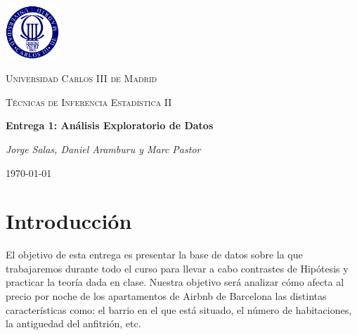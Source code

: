 \documentclass{article}
\title{}
\date{27 de noviembre de 2020}
\begin{document}
\begin{titlepage}
	\centering
	\includegraphics[width=0.15\textwidth]{uc3m}\par\vspace{1cm}
	{\scshape\LARGE Universidad Carlos III de Madrid \par}
	\vspace{1cm}
	{\scshape\Large Técnicas de Inferencia Estadística II \par}
	\vspace{1.5cm}
	{\huge\bfseries Entrega 1: Análisis Exploratorio de Datos\par}
	\vspace{2cm}
	{\Large\itshape Jorge Salas, Daniel Aramburu y Marc Pastor \par}
	\date{15 de abril de 2020}
	\vfill
	\vfill


	{\large \today\par}
\end{titlepage}

\tableofcontents

\newpage

\section{Introducción}
El objetivo de esta entrega es presentar la base de datos sobre la que trabajaremos durante todo el curso para llevar a cabo contrastes de Hipótesis y practicar la teoría dada en clase. Nuestra objetivo será analizar cómo afecta al precio por noche de los apartamentos de Airbnb de Barcelona las distintas características como: el barrio en el que está situado, el número de habitaciones, la antiguedad del anfitrión, etc.
\end{document}
